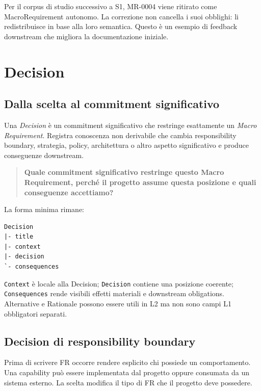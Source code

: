 \documentclass[12pt,a4paper,oneside]{report}
\newcommand{\mr}{\textit{Macro Requirement}}
\newcommand{\adr}{\textit{Decision}}
\begin{document}
\begin{resultnote}
Per il corpus di studio successivo a S1, MR-0004 viene ritirato come MacroRequirement autonomo. La correzione non cancella i suoi obblighi: li redistribuisce in base alla loro semantica. Questo è un esempio di feedback downstream che migliora la documentazione iniziale.
\end{resultnote}

\section{Decision}

\subsection{Dalla scelta al commitment significativo}

Una \adr{} è un commitment significativo che restringe esattamente un \mr. Registra conoscenza non derivabile che cambia responsibility boundary, strategia, policy, architettura o altro aspetto significativo e produce conseguenze downstream.

\begin{quote}
\textbf{Quale commitment significativo restringe questo Macro Requirement, perché il progetto assume questa posizione e quali conseguenze accettiamo?}
\end{quote}

La forma minima rimane:
\begin{lstlisting}
Decision
|- title
|- context
|- decision
`- consequences
\end{lstlisting}

\texttt{Context} è locale alla Decision; \texttt{Decision} contiene una posizione coerente; \texttt{Consequences} rende visibili effetti materiali e downstream obligations. Alternative e Rationale possono essere utili in L2 ma non sono campi L1 obbligatori separati.

\subsection{Decision di responsibility boundary}

Prima di scrivere FR occorre rendere esplicito chi possiede un comportamento. Una capability può essere implementata dal progetto oppure consumata da un sistema esterno. La scelta modifica il tipo di FR che il progetto deve possedere.
\end{document}
